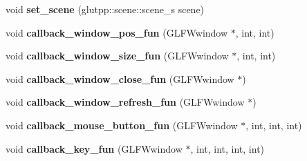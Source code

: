 \begin{DoxyCompactItemize}
\item 
\hypertarget{classglutpp_1_1window_1_1window_a05b0082d83526948c66740934367c396}{void {\bfseries set\-\_\-scene} (glutpp\-::scene\-::scene\-\_\-s scene)}\label{classglutpp_1_1window_1_1window_a05b0082d83526948c66740934367c396}

\item 
\hypertarget{classglutpp_1_1window_1_1window_ae1d72bbacdcddcd15e41588ff7007e4f}{void {\bfseries callback\-\_\-window\-\_\-pos\-\_\-fun} (\-G\-L\-F\-Wwindow $\ast$, int, int)}\label{classglutpp_1_1window_1_1window_ae1d72bbacdcddcd15e41588ff7007e4f}

\item 
\hypertarget{classglutpp_1_1window_1_1window_a4e46f9e890fd37fd4cc8581db48deb42}{void {\bfseries callback\-\_\-window\-\_\-size\-\_\-fun} (\-G\-L\-F\-Wwindow $\ast$, int, int)}\label{classglutpp_1_1window_1_1window_a4e46f9e890fd37fd4cc8581db48deb42}

\item 
\hypertarget{classglutpp_1_1window_1_1window_a5de927572afed2cb2a7424863d2af4be}{void {\bfseries callback\-\_\-window\-\_\-close\-\_\-fun} (\-G\-L\-F\-Wwindow $\ast$)}\label{classglutpp_1_1window_1_1window_a5de927572afed2cb2a7424863d2af4be}

\item 
\hypertarget{classglutpp_1_1window_1_1window_a079777619dab317cae89917b800c76cb}{void {\bfseries callback\-\_\-window\-\_\-refresh\-\_\-fun} (\-G\-L\-F\-Wwindow $\ast$)}\label{classglutpp_1_1window_1_1window_a079777619dab317cae89917b800c76cb}

\item 
\hypertarget{classglutpp_1_1window_1_1window_a3058505d4878bf1a5ceed906c313c359}{void {\bfseries callback\-\_\-mouse\-\_\-button\-\_\-fun} (\-G\-L\-F\-Wwindow $\ast$, int, int, int)}\label{classglutpp_1_1window_1_1window_a3058505d4878bf1a5ceed906c313c359}

\item 
\hypertarget{classglutpp_1_1window_1_1window_a25eba608bb59811962adeb71510503ff}{void {\bfseries callback\-\_\-key\-\_\-fun} (\-G\-L\-F\-Wwindow $\ast$, int, int, int, int)}\label{classglutpp_1_1window_1_1window_a25eba608bb59811962adeb71510503ff}

\end{DoxyCompactItemize}
